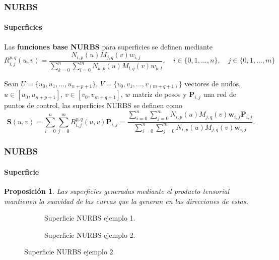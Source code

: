 \documentclass[compress]{beamer}
\newtheorem{proposition}[theorem]{Proposición}
\begin{document}
\begin{frame}
	\frametitle{NURBS}
	\framesubtitle{Superficies} 
	\scriptsize
	\begin{definition}

		Las \textbf{funciones base NURBS} para superficies se definen mediante
		\begin{equation*} 
			R_{i,j}^{p,q}(u, v) = \frac{N_{i,p}(u) M_{j,q}(v) w_{i,j}}{\sum_{k=0}^{n} \sum_{l=0}^{m} N_{k,p}(u) M_{l,q}(v) w_{k,l}} ,\quad i \in \{0,1, \dots , n\},\quad j \in \{0,1, \dots , m\}
		\end{equation*}

	\end{definition}

	\begin{definition}
		Sean $U = \{u_0, u_1, \ldots, u_{n+p+1}\}$, $V = \{v_0, v_1, \ldots, v_{(m+q+1)}\}$  vectores de nudos, $u \in [u_0, u_{n+p+1}]$, $v\in [v_0, v_{m+q+1}]$, $w$ matriz de pesos y $\mathbf{P}_{i,j}$ una red de puntos de control,
		las superficies NURBS se definen como
		\begin{equation}
			\label{eq:NURBS_Surf}
			\mathbf{S}(u, v) = \sum_{i=0}^{n} \sum_{j=0}^{m} R_{i,j}^{p,q}(u, v) \mathbf{P}_{i,j}= \frac{\sum_{i=0}^{n} \sum_{j=0}^{m} N_{i,p}(u) M_{j,q}(v) \mathbf{w}_{i,j} \mathbf{P}_{i,j}}{\sum_{i=0}^{n} \sum_{j=0}^{m} N_{i,p}(u) M_{j,q}(v) \mathbf{w}_{i,j}}.
		\end{equation}
	\end{definition}
\end{frame}

\begin{frame}
	\frametitle{NURBS}
	\framesubtitle{Superficie} 
	\scriptsize
	\begin{proposition}
    \label{prop:surf_tensor}
    Las superficies generadas mediante el producto tensorial mantienen la suavidad de las curvas que la generan en las direcciones de estas.
	\end{proposition}
	\begin{figure}[H]
    \centering
	\tiny
    \begin{subfigure}{0.45\textwidth}
        
        \caption{Superficie NURBS ejemplo 1.}
        \label{fig:NURBS_surf_1}
    \end{subfigure}
    \begin{subfigure}{0.45\textwidth}
        \scriptsize
        
        \caption{Superficie NURBS ejemplo 2.}
        \label{fig:NURBS_surf_2}
    \end{subfigure}
\end{figure}
\end{frame}
\end{document}
